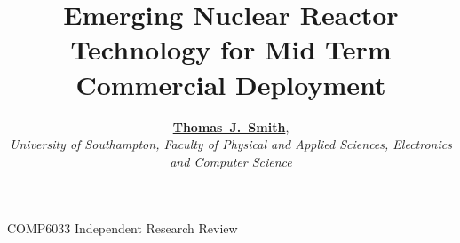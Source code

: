 \documentclass[journal]{IEEEtran}
\begin{document}
%
\title{Emerging Nuclear Reactor Technology for Mid Term Commercial Deployment}
%
%
%

\author{\textbf{\href{mailto:tjs1g10@ecs.soton.ac.uk}{Thomas~J.~Smith}},\\ \emph{\small{University of Southampton, Faculty of Physical and Applied Sciences, Electronics and Computer Science}}}%

% 
%



%
{COMP6033 Independent Research Review}
% 
\end{document}

